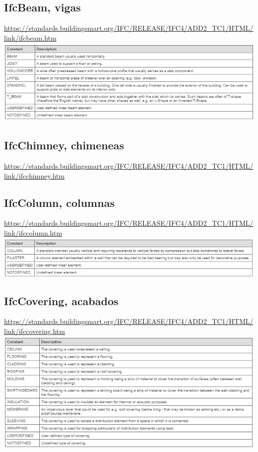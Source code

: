 \documentclass[spanish,12pt,a4paper,final,oneside]{book}
\begin{document}
\subsection{IfcBeam, vigas}
\url{https://standards.buildingsmart.org/IFC/RELEASE/IFC4/ADD2_TC1/HTML/link/ifcbeam.htm}
\\ \includegraphics[width=\textwidth]{Definicion de IfcBeamTypeEnum}

\subsection{IfcChimney, chimeneas}
\url{https://standards.buildingsmart.org/IFC/RELEASE/IFC4/ADD2_TC1/HTML/link/ifcchimney.htm}

\subsection{IfcColumn, columnas}
\url{https://standards.buildingsmart.org/IFC/RELEASE/IFC4/ADD2_TC1/HTML/link/ifccolumn.htm}
\\ \includegraphics[width=\textwidth]{Definicion de IfcColumnTypeEnum}

\subsection{IfcCovering, acabados}
\url{https://standards.buildingsmart.org/IFC/RELEASE/IFC4/ADD2_TC1/HTML/link/ifccovering.htm}
\\ \includegraphics[width=\textwidth]{Definicion de IfcCoveringTypeEnum}
\end{document}
